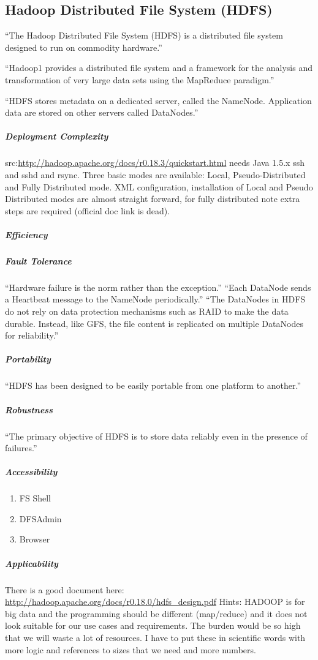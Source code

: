 \subsection{Hadoop Distributed File System (HDFS)}
``The Hadoop Distributed File System (HDFS) is a distributed file system designed to run on
commodity hardware.'' \cite[tp.~3]{HDFSDocuments}

``Hadoop1 provides a distributed file system and a framework 
for the analysis and transformation of very large data sets 
using the MapReduce \cite{DG04} paradigm.''\cite{TheHDFS}

``HDFS stores metadata on a
dedicated server, called the NameNode. Application data are stored on
other servers called DataNodes.''\cite{TheHDFS}


\subparagraph{Deployment Complexity}
src:\url{http://hadoop.apache.org/docs/r0.18.3/quickstart.html}
needs Java 1.5.x ssh and sshd and rsync. Three basic modes are available:
Local, Pseudo-Distributed and Fully Distributed mode. XML configuration,
installation of Local and Pseudo Distributed modes are almost straight
forward, for fully distributed note extra steps are required (official
doc link is dead).
\subparagraph{Efficiency}


\subparagraph{Fault Tolerance}
``Hardware failure is the norm rather than the exception.''
``Each DataNode sends a Heartbeat message to the NameNode periodically.''
``The DataNodes in HDFS do not rely on data protection mechanisms 
such as RAID to make the data durable. Instead, like GFS, 
the file content is replicated on multiple DataNodes for reliability.''
\cite{TheHDFS}
\subparagraph{Portability}


``HDFS has been designed to be easily portable from one platform to another.''
\subparagraph{Robustness}

``The primary objective of HDFS is to store data reliably even in the presence of failures.''
\subparagraph{Accessibility}
\begin{enumerate}
\item FS Shell
\item DFSAdmin
\item Browser
\end{enumerate}

\subparagraph{Applicability}
There is a good document here:
\url{http://hadoop.apache.org/docs/r0.18.0/hdfs_design.pdf}
Hints: HADOOP is for big data and the programming should be different (map/reduce)
 and it does not look suitable for our use cases and requirements. The burden would
 be so high that we will waste a lot of resources. I have to put these in scientific
 words with more logic and references to sizes that we need and more numbers.

